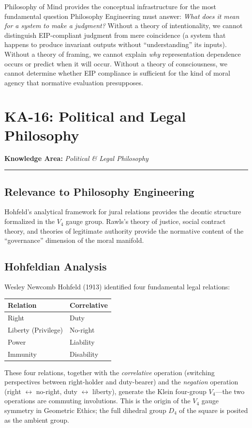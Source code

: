\documentclass[12pt,letterpaper]{article}
\theoremstyle{definition}
\theoremstyle{plain}
\newcommand{\ka}[1]{\vspace{1em}\noindent\textbf{\large Knowledge Area:} \textit{#1}\vspace{0.5em}\hrule\vspace{0.5em}}
\begin{document}
Philosophy of Mind provides the conceptual infrastructure for the most fundamental question Philosophy Engineering must answer: \emph{What does it mean for a system to make a judgment?} Without a theory of intentionality, we cannot distinguish EIP-compliant judgment from mere coincidence (a system that happens to produce invariant outputs without ``understanding'' its inputs). Without a theory of framing, we cannot explain \emph{why} representation dependence occurs or predict when it will occur. Without a theory of consciousness, we cannot determine whether EIP compliance is sufficient for the kind of moral agency that normative evaluation presupposes.


\section{KA-16: Political and Legal Philosophy}
\label{sec:ka16}

\ka{Political \& Legal Philosophy}

\subsection{Relevance to Philosophy Engineering}

Hohfeld's analytical framework for jural relations provides the deontic structure formalized in the $V_4$ gauge group. Rawls's theory of justice, social contract theory, and theories of legitimate authority provide the normative content of the ``governance'' dimension of the moral manifold.

\subsection{Hohfeldian Analysis}

Wesley Newcomb Hohfeld (1913) identified four fundamental legal relations:
\begin{center}
\begin{tabular}{ll}
\toprule
\textbf{Relation} & \textbf{Correlative} \\
\midrule
Right & Duty \\
Liberty (Privilege) & No-right \\
Power & Liability \\
Immunity & Disability \\
\bottomrule
\end{tabular}
\end{center}

These four relations, together with the \emph{correlative} operation (switching perspectives between right-holder and duty-bearer) and the \emph{negation} operation (right $\leftrightarrow$ no-right, duty $\leftrightarrow$ liberty), generate the Klein four-group $V_4$---the two operations are commuting involutions. This is the origin of the $V_4$ gauge symmetry in Geometric Ethics; the full dihedral group $D_4$ of the square is posited as the ambient group.
\end{document}
